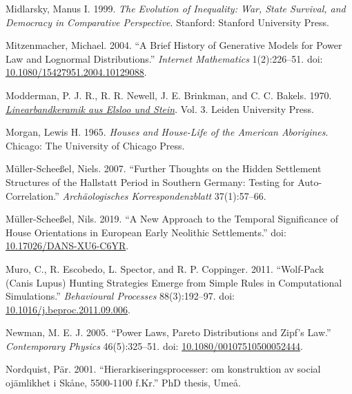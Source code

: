 \documentclass[
  12pt,
]{book}
\newlength{\cslhangindent}
\newlength{\cslentryspacingunit} %
\newenvironment{CSLReferences}[2] %
 {%
  \setlength{\parindent}{0pt}
  \ifodd #1
  \let\oldpar\par
  \def\par{\hangindent=\cslhangindent\oldpar}
  \fi
  \setlength{\parskip}{#2\cslentryspacingunit}
 }%
 {}
\begin{document}
\begin{CSLReferences}{1}{0}
\leavevmode{}%
Midlarsky, Manus I. 1999. \emph{The Evolution of Inequality: War, State Survival, and Democracy in Comparative Perspective}. Stanford: Stanford University Press.

\leavevmode{}%
Mitzenmacher, Michael. 2004. {``A Brief History of Generative Models for Power Law and Lognormal Distributions.''} \emph{Internet Mathematics} 1(2):226--51. doi: \href{https://doi.org/10.1080/15427951.2004.10129088}{10.1080/15427951.2004.10129088}.

\leavevmode{}%
Modderman, P. J. R., R. R. Newell, J. E. Brinkman, and C. C. Bakels. 1970. \emph{\href{http://hdl.handle.net/1887/2720923}{Linearbandkeramik aus Elsloo und Stein}}. Vol. 3. Leiden University Press.

\leavevmode{}%
Morgan, Lewis H. 1965. \emph{Houses and House-Life of the American Aborigines}. Chicago: The University of Chicago Press.

\leavevmode{}%
Müller-Scheeßel, Niels. 2007. {``Further Thoughts on the Hidden Settlement Structures of the Hallstatt Period in Southern Germany: Testing for Auto-Correlation.''} \emph{Archäologisches Korrespondenzblatt} 37(1):57--66.

\leavevmode{}%
Müller-Scheeßel, Nils. 2019. {``A New Approach to the Temporal Significance of House Orientations in European Early Neolithic Settlements.''} doi: \href{https://doi.org/10.17026/DANS-XU6-C6YR}{10.17026/DANS-XU6-C6YR}.

\leavevmode{}%
Muro, C., R. Escobedo, L. Spector, and R. P. Coppinger. 2011. {``Wolf-Pack (Canis Lupus) Hunting Strategies Emerge from Simple Rules in Computational Simulations.''} \emph{Behavioural Processes} 88(3):192--97. doi: \href{https://doi.org/10.1016/j.beproc.2011.09.006}{10.1016/j.beproc.2011.09.006}.

\leavevmode{}%
Newman, M. E. J. 2005. {``Power Laws, Pareto Distributions and Zipf's Law.''} \emph{Contemporary Physics} 46(5):325--51. doi: \href{https://doi.org/10.1080/00107510500052444}{10.1080/00107510500052444}.

\leavevmode{}%
Nordquist, Pär. 2001. {``Hierarkiseringsprocesser: om konstruktion av social ojämlikhet i Skåne, 5500-1100 f.Kr.''} PhD thesis, Umeå.


\end{CSLReferences}
\end{document}
